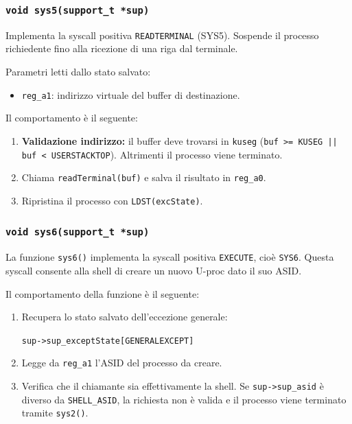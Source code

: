 \documentclass[a4paper,12pt]{article}
\begin{document}
\begin{enumerate}
 
\subsubsection{\texttt{void sys5(support\_t *sup)}}
 
Implementa la syscall positiva \texttt{READTERMINAL} (SYS5). Sospende il
processo richiedente fino alla ricezione di una riga dal terminale.
 
\medskip
Parametri letti dallo stato salvato:
 
\begin{itemize}
    \item \texttt{reg\_a1}: indirizzo virtuale del buffer di destinazione.
\end{itemize}
 
Il comportamento è il seguente:
 
\begin{enumerate}
    \item \textbf{Validazione indirizzo:} il buffer deve trovarsi in \texttt{kuseg}
          (\texttt{buf >= KUSEG || buf < USERSTACKTOP}). Altrimenti il processo viene terminato.
 
    \item Chiama \texttt{readTerminal(buf)} e salva il risultato in \texttt{reg\_a0}.
 
    \item Ripristina il processo con \texttt{LDST(excState)}.
\end{enumerate}
\vspace{0.3cm}
\subsubsection{\texttt{void sys6(support\_t *sup)}}

La funzione \texttt{sys6()} implementa la syscall positiva \texttt{EXECUTE}, cioè \texttt{SYS6}. Questa syscall consente alla shell di creare un nuovo U-proc dato il suo ASID.

Il comportamento della funzione è il seguente:

\begin{enumerate}
    \item Recupera lo stato salvato dell'eccezione generale:

        \texttt{sup->sup\_exceptState[GENERALEXCEPT]}

    \item Legge da \texttt{reg\_a1} l'ASID del processo da creare.

    \item Verifica che il chiamante sia effettivamente la shell. Se \texttt{sup->sup\_asid} è diverso da \texttt{SHELL\_ASID}, la richiesta non è valida e il processo viene terminato tramite \texttt{sys2()}.


\end{enumerate}
\end{enumerate}
\end{document}
